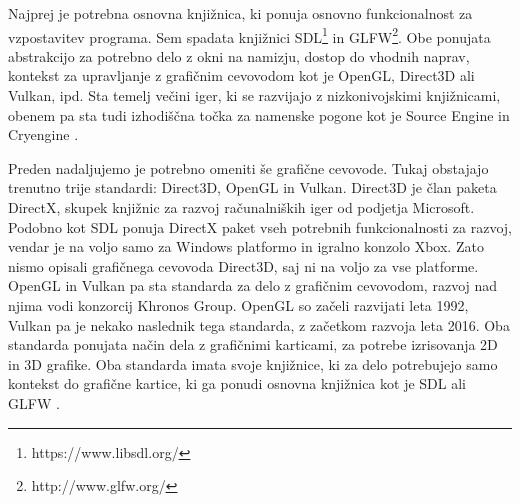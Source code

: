 \documentclass[12pt,a4paper,twoside]{book}
\begin{document}
Najprej je potrebna osnovna knjižnica, ki ponuja osnovno funkcionalnost za vzpostavitev programa. Sem spadata knjižnici SDL\footnote{https://www.libsdl.org/}\cite{sdllib} in GLFW\footnote{http://www.glfw.org/}\cite{glfw}. Obe ponujata abstrakcijo za potrebno delo z okni na namizju, dostop do vhodnih naprav, kontekst za upravljanje z grafičnim cevovodom kot je OpenGL, Direct3D ali Vulkan, ipd. Sta temelj večini iger, ki se razvijajo z nizkonivojskimi knjižnicami, obenem pa sta tudi izhodiščna točka za namenske pogone kot je Source Engine \cite{sourceEngineSDL} in Cryengine \cite{cryengineSDL}.

Preden nadaljujemo je potrebno omeniti še grafične cevovode. Tukaj obstajajo trenutno trije standardi: Direct3D, OpenGL in Vulkan. Direct3D je član paketa DirectX, skupek knjižnic za razvoj računalniških iger od podjetja Microsoft. Podobno kot SDL ponuja DirectX paket vseh potrebnih funkcionalnosti za razvoj, vendar je na voljo samo za Windows platformo in igralno konzolo Xbox. Zato nismo opisali grafičnega cevovoda Direct3D, saj ni na voljo za vse platforme. OpenGL in Vulkan pa sta standarda za delo z grafičnim cevovodom, razvoj nad njima vodi konzorcij Khronos Group. OpenGL so začeli razvijati leta 1992, Vulkan pa je nekako naslednik tega standarda, z začetkom razvoja leta 2016. Oba standarda ponujata način dela z grafičnimi karticami, za potrebe izrisovanja 2D in 3D grafike. Oba standarda imata svoje knjižnice, ki za delo potrebujejo samo kontekst do grafične kartice, ki ga ponudi osnovna knjižnica kot je SDL ali GLFW \cite{opengl}. 
\end{document}

